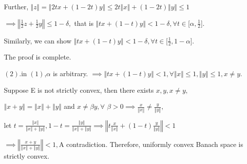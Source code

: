 \documentclass{article}
\begin{document}
Further, $\left\Vert z\right\Vert =\left\Vert 2tx+\left( 1-2t\right)
y\right\Vert \leq 2t\left\Vert x\right\Vert +\left( 1-2t\right) \left\Vert
y\right\Vert \leq 1$

$\implies \left\Vert \frac{1}{2}z+\frac{1}{2}y\right\Vert \leq 1-\delta ,$%
that is $\left\Vert tx+\left( 1-t\right) y\right\Vert <1-\delta ,\forall
t\in \lbrack \alpha ,\frac{1}{2}].$

Similarly, we can show $\left\Vert tx+\left( 1-t\right) y\right\Vert
<1-\delta ,\forall t\in \lbrack \frac{1}{2},1-\alpha ].$

The proof is complete.

$\left( 2\right) .$in $\left( 1\right) $,$\alpha $ is arbitrary. $\implies
\left\Vert tx+\left( 1-t\right) y\right\Vert <1,\forall \left\Vert
x\right\Vert \leq 1,\left\Vert y\right\Vert \leq 1,x\neq y.$

Suppose E is not strictly convex, then there exists $x,y,x\neq y,$

$\left\Vert x+y\right\Vert =\left\Vert x\right\Vert +\left\Vert y\right\Vert 
$ and $x\neq \beta y,\forall $ $\beta >0\implies \frac{x}{\left\Vert
x\right\Vert }\neq \frac{y}{\left\Vert y\right\Vert },$

let $t=\frac{\left\Vert x\right\Vert }{\left\Vert x\right\Vert +\left\Vert
y\right\Vert },1-t=\frac{\left\Vert y\right\Vert }{\left\Vert x\right\Vert
+\left\Vert y\right\Vert }\implies \left\Vert t\frac{x}{\left\Vert
x\right\Vert }+\left( 1-t\right) \frac{y}{\left\Vert y\right\Vert }%
\right\Vert <1$

$\implies \left\Vert \frac{x+y}{\left\Vert x\right\Vert +\left\Vert
y\right\Vert }\right\Vert <1,$A contradiction. Therefore, uniformly convex
Banach space is strictly convex.
\end{document}
